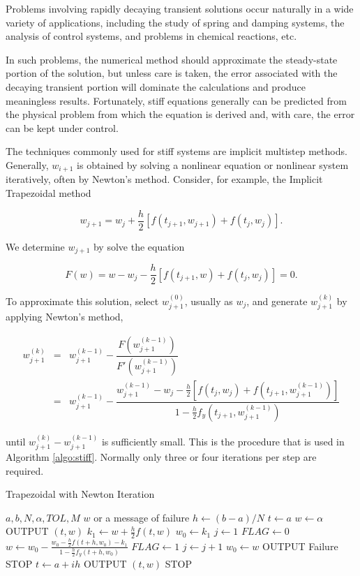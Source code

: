 \documentclass[preprint,12pt]{elsarticle}
\begin{document}
Problems involving rapidly decaying transient solutions occur naturally in a wide variety of applications, including the study of spring and damping systems, the analysis of control systems, and problems in chemical reactions, etc.

In such problems, the numerical method should approximate the steady-state portion of the solution, but unless care is taken, the error associated with the decaying transient portion will dominate the calculations and produce meaningless results. Fortunately, stiff equations generally can be predicted from the physical problem from which the equation is derived and, with care, the error can be kept under control.

The techniques commonly used for stiff systems are implicit multistep methods. Generally, $w_{i+1}$ is obtained by solving a nonlinear equation or nonlinear system iteratively, often by Newton's method. Consider, for example, the Implicit Trapezoidal method

$$
w_{j+1} = w_j +\frac{h}{2} [f(t_{j+1},w_{j+1})+f(t_j,w_j)].
$$

We determine $w_{j+1}$ by solve the equation

$$
F(w) = w- w_j -\frac{h}{2} [f(t_{j+1},w)+f(t_j,w_j)] =0.
$$

To approximate this solution, select $w_{j+1}^{(0)}$, usually as $w_j$, and generate $w_{j+1}^{(k)}$ by applying Newton's method,

$$
\begin{array}{lll}
w_{j+1}^{(k)} & = & w_{j+1}^{(k-1)} - \dfrac{F(w_{j+1}^{(k-1)})}{F'(w_{j+1}^{(k-1)})} \\[10pt]
& = & w_{j+1}^{(k-1)} - \dfrac{w_{j+1}^{(k-1)}-w_j
-\frac{h}{2}[f(t_j,w_j)+f(t_{j+1},w_{j+1}^{(k-1)})]}
{1-\frac{h}{2}f_y(t_{j+1},w_{j+1}^{(k-1)})}
\end{array}
$$

until $w_{j+1}^{(k)} -w_{j+1}^{(k-1)}$ is sufficiently small. This is the procedure that is used in Algorithm \ref{algo:stiff}. Normally only three or four iterations per step are required.

\begin{algorithm}
  \caption{Trapezoidal with Newton Iteration}
  \label{algo:stiff}
  \begin{algorithmic}[1]
  \Require $a,b,N,\alpha,TOL,M$
  \Ensure $w$ or a message of failure
  \State $h\gets (b-a)/N$
  \State $t\gets a$
  \State $w\gets \alpha$
  \State OUTPUT $(t,w)$
    \State $k_1 \gets w+\frac{h}{2}f(t,w)$
    \State $w_0 \gets k_1$
    \State $j\gets 1$
    \State $FLAG\gets 0$
      \State $w\gets w_{0}-\frac{w_{0}-\frac{h}{2}f(t+h,w_0)-k_1}{1-\frac{h}{2}f_{y}(t+h,w_0)}$
        \State $FLAG\gets 1$
      \Else
        \State $j\gets j+1$
        \State $w_0 \gets w$
          \State OUTPUT Failure
          \State STOP
        \EndIf
      \EndIf
    \EndWhile
    \State $t\gets a+ih$
    \State OUTPUT $(t,w)$
  \EndFor
  \State STOP
  \end{algorithmic}
\end{algorithm}
\end{document}
